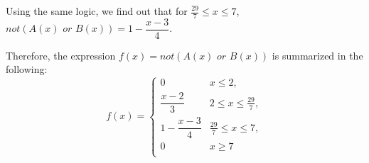 Using the same logic, we find out that for $\frac{29}{7} \le x \le 7$, $\textit{not}\left(A(x) \textit{ or } B(x)\right) = 1 - \dfrac{x-3}{4}$. 

Therefore, the expression $f(x) = \textit{not}\left(A(x) \textit{ or } B(x)\right)$ is summarized in the following:
\begin{equation}
	f(x) = \left\{
	\begin{array}{cc}
		0 & x \le 2, \\[3pt]
		\dfrac{x-2}{3} & 2 \le x \le \frac{29}{7}, \\[7pt]
		1 - \dfrac{x-3}{4} & \frac{29}{7} \le x \le 7, \\[3pt]
		0 & x \ge 7\\
	\end{array}
	\right.
\end{equation}